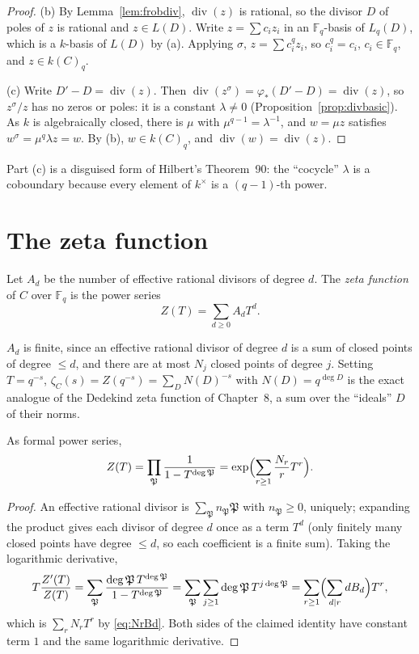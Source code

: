 \begin{proof}
(b) By Lemma~\ref{lem:frobdiv}, $\operatorname{div}(z)$ is rational, so the divisor $D$ of poles of $z$ is rational and $z\in L(D)$. Write $z=\sum c_iz_i$ in an
$\mathbb F_q$-basis of $L_q(D)$, which is a $k$-basis of $L(D)$ by (a). Applying $\sigma$, $z=\sum c_i^qz_i$, so $c_i^q=c_i$, $c_i\in\mathbb F_q$, and
$z\in k(C)_q$.

(c) Write $D'-D=\operatorname{div}(z)$. Then $\operatorname{div}(z^\sigma)=\varphi_*(D'-D)=\operatorname{div}(z)$, so $z^\sigma/z$ has no zeros or poles: it is a
constant $\lambda\ne0$ (Proposition~\ref{prop:divbasic}). As $k$ is algebraically closed, there is $\mu$ with $\mu^{q-1}=\lambda^{-1}$, and
$w=\mu z$ satisfies $w^\sigma=\mu^q\lambda z=w$. By (b), $w\in k(C)_q$, and $\operatorname{div}(w)=\operatorname{div}(z)$.
\end{proof}

Part (c) is a disguised form of Hilbert's Theorem~90: the ``cocycle'' $\lambda$ is a coboundary because every element of $k^\times$ is a $(q-1)$-th power.

\section{The zeta function}

\begin{definition}
Let $A_d$ be the number of effective rational divisors of degree $d$. The \emph{zeta function} of $C$ over $\mathbb F_q$ is the power series
\[
Z(T)=\sum_{d\ge0}A_dT^d.
\]
\end{definition}

$A_d$ is finite, since an effective rational divisor of degree $d$ is a sum of closed points of degree $\le d$, and there are at most $N_j$ closed points of degree
$j$. Setting $T=q^{-s}$, $\zeta_C(s)=Z(q^{-s})=\sum_D N(D)^{-s}$ with $N(D)=q^{\deg D}$ is the exact analogue of the Dedekind zeta function of Chapter~8, a sum over
the ``ideals'' $D$ of their norms.

\begin{proposition}\label{prop:euler}
As formal power series,
\[
Z(T)=\prod_{\mathfrak P}\frac1{1-T^{\deg\mathfrak P}}=\exp\Bigl(\sum_{r\ge1}\frac{N_r}rT^r\Bigr).
\]
\end{proposition}
\begin{proof}
An effective rational divisor is $\sum_{\mathfrak P}n_{\mathfrak P}\mathfrak P$ with $n_{\mathfrak P}\ge0$, uniquely; expanding the product gives each divisor of
degree $d$ once as a term $T^d$ (only finitely many closed points have degree $\le d$, so each coefficient is a finite sum). Taking the logarithmic derivative,
\[
T\frac{Z'(T)}{Z(T)}=\sum_{\mathfrak P}\frac{\deg\mathfrak P\,T^{\deg\mathfrak P}}{1-T^{\deg\mathfrak P}}=\sum_{\mathfrak P}\sum_{j\ge1}\deg\mathfrak P\,T^{j\deg\mathfrak P}
=\sum_{r\ge1}\Bigl(\sum_{d\mid r}dB_d\Bigr)T^r,
\]
which is $\sum_rN_rT^r$ by \eqref{eq:NrBd}. Both sides of the claimed identity have constant term $1$ and the same logarithmic derivative.
\end{proof}

